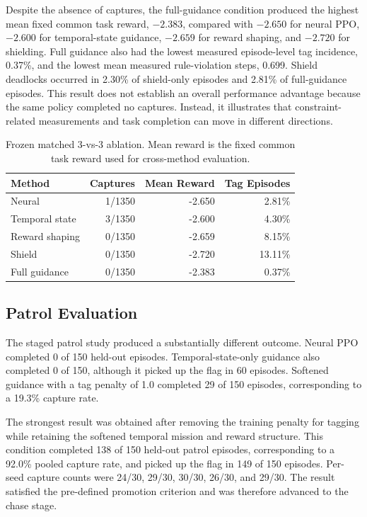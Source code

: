 \documentclass[letterpaper]{article}
\begin{document}
Despite the absence of captures, the full-guidance condition produced the highest mean fixed common task reward, $-2.383$, compared with $-2.650$ for neural PPO, $-2.600$ for temporal-state guidance, $-2.659$ for reward shaping, and $-2.720$ for shielding. Full guidance also had the lowest measured episode-level tag incidence, 0.37\%, and the lowest mean measured rule-violation steps, 0.699. Shield deadlocks occurred in 2.30\% of shield-only episodes and 2.81\% of full-guidance episodes. This result does not establish an overall performance advantage because the same policy completed no captures. Instead, it illustrates that constraint-related measurements and task completion can move in different directions.

\begin{table}[htbp]
\centering
\small
\setlength{\tabcolsep}{4pt}
\begin{tabular}{lrrr}
\hline
Method & Captures & Mean Reward & Tag Episodes \\
\hline
Neural & 1/1350 & -2.650 & 2.81\% \\
Temporal state & 3/1350 & -2.600 & 4.30\% \\
Reward shaping & 0/1350 & -2.659 & 8.15\% \\
Shield & 0/1350 & -2.720 & 13.11\% \\
Full guidance & 0/1350 & -2.383 & 0.37\% \\
\hline
\end{tabular}
\caption{Frozen matched 3-vs-3 ablation. Mean reward is the fixed common task reward used for cross-method evaluation.}
\label{tab:frozen}
\end{table}

\subsection{Patrol Evaluation}

The staged patrol study produced a substantially different outcome. Neural PPO completed 0 of 150 held-out episodes. Temporal-state-only guidance also completed 0 of 150, although it picked up the flag in 60 episodes. Softened guidance with a tag penalty of 1.0 completed 29 of 150 episodes, corresponding to a 19.3\% capture rate.

The strongest result was obtained after removing the training penalty for tagging while retaining the softened temporal mission and reward structure. This condition completed 138 of 150 held-out patrol episodes, corresponding to a 92.0\% pooled capture rate, and picked up the flag in 149 of 150 episodes. Per-seed capture counts were 24/30, 29/30, 30/30, 26/30, and 29/30. The result satisfied the pre-defined promotion criterion and was therefore advanced to the chase stage.
\end{document}
